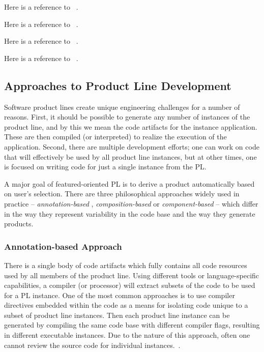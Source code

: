 Here is a reference to ~\cite{Vasilevskiy:2016:TRP:2934466.2934484}.

Here is a reference to ~\cite{Kuhn:2015:CPC:2791060.2791092}.

Here is a reference to ~\cite{Schaefer:2010:DPS:1885639.1885647}.

Here is a reference to ~\cite{Apel:2008:AFF:1428476.1428480}.


\subsection{Approaches to Product Line Development}

Software product lines create unique engineering challenges for a number
of reasons. First, it should be possible to generate any number of
instances of the product line, and by this we mean the code artifacts
for the instance application. These are then compiled (or interpreted)
to realize the execution of the application. Second, there are multiple
development efforts; one can work on code that will effectively be used
by all product line instances, but at other times, one is focused on
writing code for just a single instance from the PL.

A major goal of featured-oriented PL is to derive a product
automatically based on user’s selection. There are three philosophical
approaches widely used in practice -- \textit{annotation-based} ,
\textit{composition-based} or \textit{component-based} -- which differ in the way they represent
variability in the code base and the way they generate products.

\subsubsection{Annotation-based Approach}

There is a single body of code artifacts which fully contains all code
resources used by all members of the product line. Using different tools
or language-specific capabilities, a compiler (or processor) will
extract subsets of the code to be used for a PL instance. One of the
most common approaches is to use compiler directives embedded within the
code as a means for isolating code unique to a subset of product line
instances. Then each product line instance can be generated by compiling
the same code base with different compiler flags, resulting in different
executable instances. Due to the nature of this approach, often one
cannot review the source code for individual
instances.~\cite{Apel:2013:FSP:2541773}.

